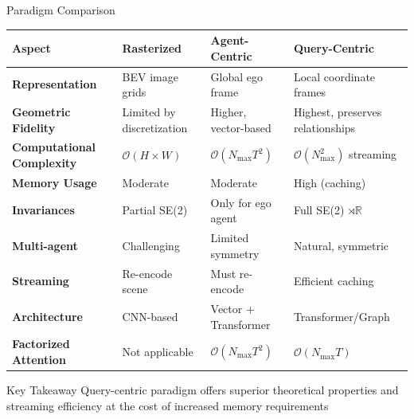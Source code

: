 \documentclass[10pt,aspectratio=169]{beamer}
\begin{document}
\begin{frame}{Paradigm Comparison}
\begin{table}[ht]
\centering
\footnotesize
\begin{tabular}{|p{2cm}|p{2.5cm}|p{2.5cm}|p{2.5cm}|}
\hline
\textbf{Aspect} & \textbf{Rasterized} & \textbf{Agent-Centric} & \textbf{Query-Centric} \\
\hline
\textbf{Representation} & BEV image grids & Global ego frame & Local coordinate frames \\
\hline
\textbf{Geometric Fidelity} & Limited by discretization & Higher, vector-based & Highest, preserves relationships \\
\hline
\textbf{Computational Complexity} & $\mathcal{O}(H \times W)$ & $\mathcal{O}(N_{\max}T^2)$ & $\mathcal{O}(N_{\max}^2)$ streaming \\
\hline
\textbf{Memory Usage} & Moderate & Moderate & High (caching) \\
\hline
\textbf{Invariances} & Partial SE(2) & Only for ego agent & Full SE(2) $\rtimes \mathbb{R}$ \\
\hline
\textbf{Multi-agent} & Challenging & Limited symmetry & Natural, symmetric \\
\hline
\textbf{Streaming} & Re-encode scene & Must re-encode & Efficient caching \\
\hline
\textbf{Architecture} & CNN-based & Vector + Transformer & Transformer/Graph \\
\hline
\textbf{Factorized Attention} & Not applicable & $\mathcal{O}(N_{\max}T^2)$ & $\mathcal{O}(N_{\max}T)$ \\
\hline
\end{tabular}
\end{table}

\begin{block}{Key Takeaway}
Query-centric paradigm offers superior theoretical properties and streaming efficiency at the cost of increased memory requirements
\end{block}
\end{frame}

\end{document}
